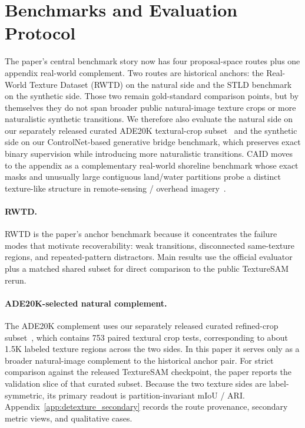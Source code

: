 \section{Benchmarks and Evaluation Protocol}
\label{sec:data}

The paper's central benchmark story now has four proposal-space routes plus one appendix real-world complement. Two routes are historical anchors: the Real-World Texture Dataset (RWTD) on the natural side and the STLD benchmark on the synthetic side. Those two remain gold-standard comparison points, but by themselves they do not span broader public natural-image texture crops or more naturalistic synthetic transitions. We therefore also evaluate the natural side on our separately released curated ADE20K textural-crop subset~\cite{detextureade20k2026} and the synthetic side on our ControlNet-based generative bridge benchmark, which preserves exact binary supervision while introducing more naturalistic transitions. CAID moves to the appendix as a complementary real-world shoreline benchmark whose exact masks and unusually large contiguous land/water partitions probe a distinct texture-like structure in remote-sensing / overhead imagery~\cite{wang2025caid}.

\paragraph{RWTD.} RWTD is the paper's anchor benchmark because it concentrates the failure modes that motivate recoverability: weak transitions, disconnected same-texture regions, and repeated-pattern distractors. Main results use the official evaluator plus a matched shared subset for direct comparison to the public TextureSAM rerun.

\paragraph{ADE20K-selected natural complement.} The ADE20K complement uses our separately released curated refined-crop subset~\cite{detextureade20k2026}, which contains 753 paired textural crop tests, corresponding to about 1.5K labeled texture regions across the two sides. In this paper it serves only as a broader natural-image complement to the historical anchor pair. For strict comparison against the released TextureSAM checkpoint, the paper reports the validation slice of that curated subset. Because the two texture sides are label-symmetric, its primary readout is partition-invariant mIoU / ARI. Appendix~\ref{app:detexture_secondary} records the route provenance, secondary metric views, and qualitative cases.

